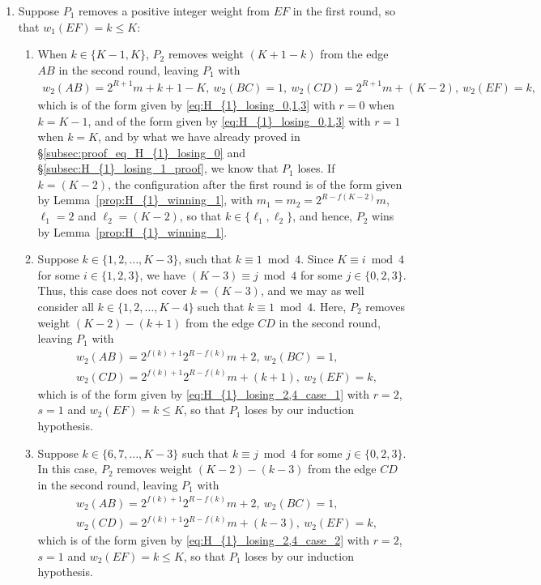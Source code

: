 \documentclass[11pt,reqno]{amsart}
\theoremstyle{definition}
\theoremstyle{definition}
\begin{document}
\begin{enumerate}
\item Suppose $P_{1}$ removes a positive integer weight from $EF$ in the first round, so that $w_{1}(EF)=k\leqslant K$:
\begin{enumerate}
\item When $k \in \{K-1,K\}$, $P_{2}$ removes weight $(K+1-k)$ from the edge $AB$ in the second round, leaving $P_{1}$ with
\begin{align}
w_{2}(AB)=2^{R+1}m+k+1-K,\ w_{2}(BC)=1,\ w_{2}(CD)=2^{R+1}m+(K-2),\ w_{2}(EF)=k,\nonumber
\end{align}
which is of the form given by \eqref{eq:H_{1}_losing_0,1,3} with $r=0$ when $k=K-1$, and of the form given by \eqref{eq:H_{1}_losing_0,1,3} with $r=1$ when $k=K$, and by what we have already proved in \S\ref{subsec:proof_eq_H_{1}_losing_0} and \S\ref{subsec:H_{1}_losing_1_proof}, we know that $P_{1}$ loses. If $k=(K-2)$, the configuration after the first round is of the form given by Lemma~\ref{prop:H_{1}_winning_1}, with $m_{1}=m_{2}=2^{R-f(K-2)}m$, $\ell_{1}=2$ and $\ell_{2}=(K-2)$, so that $k \in \{\ell_{1},\ell_{2}\}$, and hence, $P_{2}$ wins by Lemma~\ref{prop:H_{1}_winning_1}.

\item Suppose $k\in \{1,2,\ldots,K-3\}$, such that $k \equiv 1 \bmod 4$. Since $K \equiv i \bmod 4$ for some $i \in \{1,2,3\}$, we have $(K-3) \equiv j \bmod 4$ for some $j \in \{0,2,3\}$. Thus, this case does not cover $k=(K-3)$, and we may as well consider all $k \in \{1,2,\ldots,K-4\}$ such that $k \equiv 1 \bmod 4$. Here, $P_{2}$ removes weight $(K-2)-(k+1)$ from the edge $CD$ in the second round, leaving $P_{1}$ with
\begin{align}
{}&w_{2}(AB)=2^{f(k)+1}2^{R-f(k)}m+2,\ w_{2}(BC)=1,\nonumber\\
{}&w_{2}(CD)=2^{f(k)+1}2^{R-f(k)}m+(k+1),\ w_{2}(EF)=k,\nonumber
\end{align} 
which is of the form given by \eqref{eq:H_{1}_losing_2,4_case_1} with $r=2$, $s=1$ and $w_{2}(EF)=k\leqslant K$, so that $P_{1}$ loses by our induction hypothesis.

\item Suppose $k\in\{6,7,\ldots,K-3\}$ such that $k \equiv j \bmod 4$ for some $j \in \{0,2,3\}$. In this case, $P_{2}$ removes weight $(K-2)-(k-3)$ from the edge $CD$ in the second round, leaving $P_{1}$ with
\begin{align}
{}&w_{2}(AB)=2^{f(k)+1}2^{R-f(k)}m+2,\ w_{2}(BC)=1,\nonumber\\
{}&w_{2}(CD)=2^{f(k)+1}2^{R-f(k)}m+(k-3),\ w_{2}(EF)=k,\nonumber
\end{align} 
which is of the form given by \eqref{eq:H_{1}_losing_2,4_case_2} with $r=2$, $s=1$ and $w_{2}(EF)=k\leqslant K$, so that $P_{1}$ loses by our induction hypothesis.


\end{enumerate}
\end{enumerate}
\end{document}
